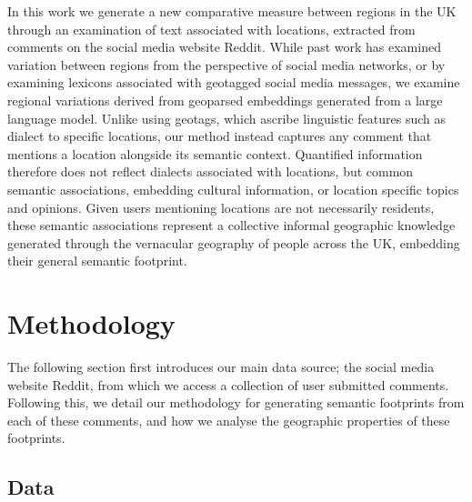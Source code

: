 \documentclass[
  letterpaper,
  11pt,
  english,
  onehalfspacing,
  headsepline]{MastersDoctoralThesis}
\begin{document}
In this work we generate a new comparative measure between regions in
the UK through an examination of text associated with locations,
extracted from comments on the social media website Reddit. While past
work has examined variation between regions from the perspective of
social media networks, or by examining lexicons associated with
geotagged social media messages, we examine regional variations derived
from geoparsed embeddings generated from a large language model. Unlike
using geotags, which ascribe linguistic features such as dialect to
specific locations, our method instead captures any comment that
mentions a location alongside its semantic context. Quantified
information therefore does not reflect dialects associated with
locations, but common semantic associations, embedding cultural
information, or location specific topics and opinions. Given users
mentioning locations are not necessarily residents, these semantic
associations represent a collective informal geographic knowledge
generated through the vernacular geography of people across the UK,
embedding their general semantic footprint.

\hypertarget{sec-methodology}{%
\section{Methodology}\label{sec-methodology}}

The following section first introduces our main data source; the social
media website Reddit, from which we access a collection of user
submitted comments. Following this, we detail our methodology for
generating semantic footprints from each of these comments, and how we
analyse the geographic properties of these footprints.

\hypertarget{data}{%
\subsection{Data}\label{data}}
\end{document}
